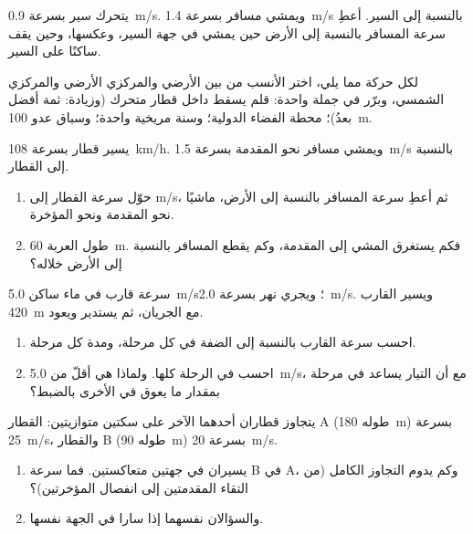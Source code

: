 \begin{exercise}[$\star$]\label{exo:g10:relative-motion:4}
يتحرك سير بسرعة \qty{0.9}{m/s}. ويمشي مسافر بسرعة
\qty{1.4}{m/s} بالنسبة إلى السير. أعطِ سرعة المسافر بالنسبة
إلى الأرض حين يمشي في جهة السير، وعكسها، وحين
يقف ساكنًا على السير.
\end{exercise}

\begin{exercise}[$\star$]\label{exo:g10:relative-motion:5}
لكل حركة مما يلي، اختر  الأنسب من بين الأرضي
والمركزي الأرضي والمركزي الشمسي، وبرّر في جملة واحدة: قلم يسقط
داخل قطار متحرك (وزيادة: ثمة  أفضل بعدُ)؛ 
محطة الفضاء الدولية؛ وسنة مريخية واحدة؛ وسباق
عدو \qty{100}{m}.
\end{exercise}

\begin{exercise}[$\star\star$]\label{exo:g10:relative-motion:6}
يسير قطار بسرعة \qty{108}{km/h}. ويمشي مسافر نحو المقدمة بسرعة
\qty{1.5}{m/s} بالنسبة إلى القطار.
\begin{enumerate}
  \item حوّل سرعة القطار إلى \unit{m/s}، ثم أعطِ
        سرعة المسافر بالنسبة إلى الأرض، ماشيًا نحو
        المقدمة ونحو المؤخرة.
  \item طول العربة \qty{60}{m}. فكم يستغرق المشي إلى
        المقدمة، وكم يقطع المسافر بالنسبة إلى الأرض خلاله؟
\end{enumerate}
\end{exercise}

\begin{exercise}[$\star\star$]\label{exo:g10:relative-motion:7}
سرعة قارب في ماء ساكن \qty{5.0}{m/s}؛ ويجري نهر بسرعة
\qty{2.0}{m/s}. ويسير القارب \qty{420}{m} مع الجريان، ثم يستدير
ويعود.
\begin{enumerate}
  \item احسب سرعة القارب بالنسبة إلى الضفة في كل مرحلة،
        ومدة كل مرحلة.
  \item احسب  في الرحلة كلها. ولماذا هي أقلّ
        من \qty{5.0}{m/s}، مع أن التيار يساعد في مرحلة
        بمقدار ما يعوق في الأخرى بالضبط؟
\end{enumerate}
\end{exercise}

\begin{exercise}[$\star\star$]\label{exo:g10:relative-motion:8}
يتجاوز قطاران أحدهما الآخر على سكتين متوازيتين: القطار A (طوله
\qty{180}{m}) بسرعة \qty{25}{m/s}، والقطار B (طوله \qty{90}{m}) بسرعة \qty{20}{m/s}.
\begin{enumerate}
  \item يسيران في جهتين متعاكستين. فما سرعة B في
         A، وكم يدوم التجاوز الكامل
        (من التقاء المقدمتين إلى انفصال المؤخرتين)؟
  \item والسؤالان نفسهما إذا سارا في الجهة نفسها.
\end{enumerate}
\end{exercise}

